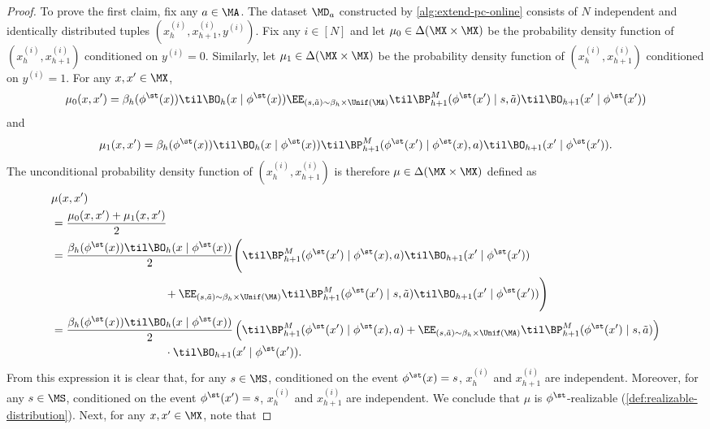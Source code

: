 \begin{proof}
To prove the first claim, fix any $a \in \MA$. The dataset $\MD_a$ constructed by \cref{alg:extend-pc-online} consists of $N$ independent and identically distributed tuples $(x_h^{(i)},x_{h+1}^{(i)},y^{(i)})$. Fix any $i \in [N]$ and let $\mu_0 \in \Delta(\MX\times\MX)$ be the probability density function of $(x_h^{(i)},x_{h+1}^{(i)})$ conditioned on $y^{(i)} = 0$. Similarly, let $\mu_1 \in \Delta(\MX\times\MX)$ be the probability density function of $(x_h^{(i)},x_{h+1}^{(i)})$ conditioned on $y^{(i)} = 1$. For any $x,x' \in \MX$,
\begin{equation} \mu_0(x,x') = \beta_h(\phi^\st(x)) \til\BO_h(x\mid{}\phi^\st(x)) \EE_{(s,\tilde a)\sim \beta_h\times\Unif(\MA)} \til\BP^M_{h+1}(\phi^\st(x')\mid{}s,\tilde a)\til\BO_{h+1}(x'\mid{}\phi^\st(x'))\label{eq:mu0-density}\end{equation}
and
\[\mu_1(x,x') = \beta_h(\phi^\st(x)) \til\BO_h(x\mid{}\phi^\st(x)) \til\BP^M_{h+1}(\phi^\st(x')\mid{}\phi^\st(x),a) \til\BO_{h+1}(x'\mid{}\phi^\st(x')).\]
The unconditional probability density function of $(x_h^{(i)},x_{h+1}^{(i)})$ is therefore $\mu \in \Delta(\MX\times\MX)$ defined as
\begin{align*}
&\mu(x,x')  \\
&= \frac{\mu_0(x,x')+\mu_1(x,x')}{2} \\ 
&= \frac{\beta_h(\phi^\st(x))\til\BO_h(x\mid{}\phi^\st(x))}{2}\Bigg(\til\BP^M_{h+1}(\phi^\st(x')\mid{}\phi^\st(x),a) \til\BO_{h+1}(x'\mid{}\phi^\st(x')) \\
&\hspace{10em}+ \EE_{(s,\tilde a)\sim \beta_h\times\Unif(\MA)} \til\BP^M_{h+1}(\phi^\st(x')\mid{}s,\tilde a)\til\BO_{h+1}(x'\mid{}\phi^\st(x'))\Bigg) \\ 
&= \frac{\beta_h(\phi^\st(x))\til\BO_h(x\mid{}\phi^\st(x))}{2}\left(\til\BP^M_{h+1}(\phi^\st(x')\mid{}\phi^\st(x),a)  + \EE_{(s,\tilde a)\sim \beta_h\times\Unif(\MA)} \til\BP^M_{h+1}(\phi^\st(x')\mid{}s,\tilde a)\right) \\
&\hspace{10em} \cdot \til\BO_{h+1}(x'\mid{}\phi^\st(x')).
\end{align*}
From this expression it is clear that, for any $s \in \MS$, conditioned on the event $\phi^\st(x) = s$, $x_h^{(i)}$ and $x_{h+1}^{(i)}$ are independent. Moreover, for any $s \in \MS$, conditioned on the event $\phi^\st(x') = s$, $x_h^{(i)}$ and $x_{h+1}^{(i)}$ are independent. We conclude that $\mu$ is $\phi^\st$-realizable (\cref{def:realizable-distribution}). Next, for any $x,x' \in \MX$, note that

\end{proof}
